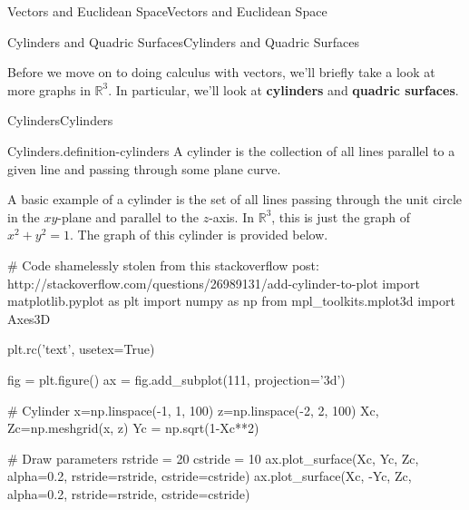 \documentclass[10pt,]{book}
\newcommand{\terminology}[1]{\textbf{#1}}
\numberwithin{equation}{section}
\newcommand{\RR}{\mathbb{R}}
\begin{document}
\begin{chapterptx}{Vectors and Euclidean Space}{}{Vectors and Euclidean Space}{}{}
\typeout{************************************************}
%
\begin{sectionptx}{Cylinders and Quadric Surfaces}{}{Cylinders and Quadric Surfaces}{}{}\label{section-cylinders-and-quadric-surfaces}
\begin{introduction}{}%
\hypertarget{p-1017}{}%
Before we move on to doing calculus with vectors, we'll briefly take a look at more graphs in \(\RR^{3}\). In particular, we'll look at \terminology{cylinders} and \terminology{quadric surfaces}.%
\end{introduction}%
%
%
\typeout{************************************************}
\typeout{************************************************}
%
\begin{subsectionptx}{Cylinders}{}{Cylinders}{}{}\label{subsection-cylinders}
\begin{definition}{Cylinders.}{definition-cylinders}%
\hypertarget{p-1018}{}%
A cylinder is the collection of all lines parallel to a given line and passing through some plane curve.%
\end{definition}
\hypertarget{p-1019}{}%
A basic example of a cylinder is the set of all lines passing through the unit circle in the \(xy\)-plane and parallel to the \(z\)-axis. In \(\RR^{3}\), this is just the graph of \(x^{2}+y^{2}=1\). The graph of this cylinder is provided below.%
\begin{sageinput}
# Code shamelessly stolen from this stackoverflow post: http://stackoverflow.com/questions/26989131/add-cylinder-to-plot
import matplotlib.pyplot as plt
import numpy as np
from mpl_toolkits.mplot3d import Axes3D

plt.rc('text', usetex=True)

fig = plt.figure()
ax = fig.add_subplot(111, projection='3d')

# Cylinder
x=np.linspace(-1, 1, 100)
z=np.linspace(-2, 2, 100)
Xc, Zc=np.meshgrid(x, z)
Yc = np.sqrt(1-Xc**2)

# Draw parameters
rstride = 20
cstride = 10
ax.plot_surface(Xc, Yc, Zc, alpha=0.2, rstride=rstride, cstride=cstride)
ax.plot_surface(Xc, -Yc, Zc, alpha=0.2, rstride=rstride, cstride=cstride)


\end{sageinput}
\end{subsectionptx}
\end{sectionptx}
\end{chapterptx}
\end{document}
